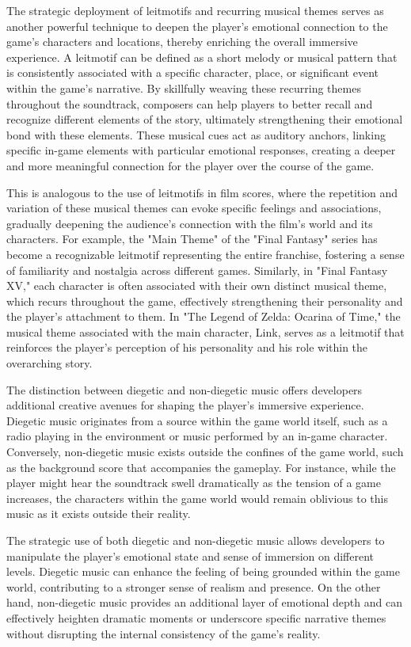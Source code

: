 \documentclass{article}
\begin{document}
    The strategic deployment of leitmotifs and recurring musical themes serves as another powerful technique to deepen the player's emotional connection to the game's characters and locations, thereby enriching the overall immersive experience. A leitmotif can be defined as a short melody or musical pattern that is consistently associated with a specific character, place, or significant event within the game's narrative. By skillfully weaving these recurring themes throughout the soundtrack, composers can help players to better recall and recognize different elements of the story, ultimately strengthening their emotional bond with these elements. These musical cues act as auditory anchors, linking specific in-game elements with particular emotional responses, creating a deeper and more meaningful connection for the player over the course of the game.

    This is analogous to the use of leitmotifs in film scores, where the repetition and variation of these musical themes can evoke specific feelings and associations, gradually deepening the audience's connection with the film's world and its characters. For example, the "Main Theme" of the "Final Fantasy" series has become a recognizable leitmotif representing the entire franchise, fostering a sense of familiarity and nostalgia across different games. Similarly, in "Final Fantasy XV," each character is often associated with their own distinct musical theme, which recurs throughout the game, effectively strengthening their personality and the player's attachment to them. In "The Legend of Zelda: Ocarina of Time," the musical theme associated with the main character, Link, serves as a leitmotif that reinforces the player's perception of his personality and his role within the overarching story.

    The distinction between diegetic and non-diegetic music offers developers additional creative avenues for shaping the player's immersive experience. Diegetic music originates from a source within the game world itself, such as a radio playing in the environment or music performed by an in-game character. Conversely, non-diegetic music exists outside the confines of the game world, such as the background score that accompanies the gameplay. For instance, while the player might hear the soundtrack swell dramatically as the tension of a game increases, the characters within the game world would remain oblivious to this music as it exists outside their reality.

    The strategic use of both diegetic and non-diegetic music allows developers to manipulate the player's emotional state and sense of immersion on different levels. Diegetic music can enhance the feeling of being grounded within the game world, contributing to a stronger sense of realism and presence. On the other hand, non-diegetic music provides an additional layer of emotional depth and can effectively heighten dramatic moments or underscore specific narrative themes without disrupting the internal consistency of the game's reality.
\end{document}
